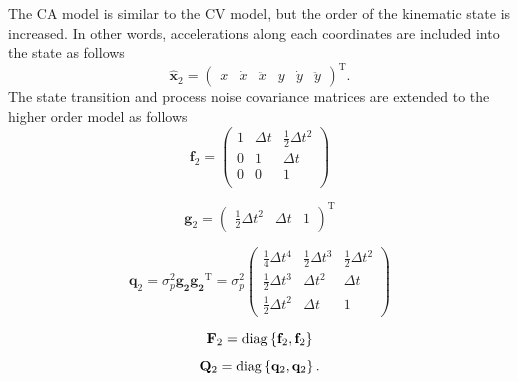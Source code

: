 \documentclass[english, 12pt, a4paper, elec, utf8, a-1b, online]{aaltothesis}
\renewcommand{\vec}[1]{\mathbf{#1}}
\newcommand{\transpose}[1]{#1^\text{T}}
\newcommand{\dt}{\Delta t}
\begin{document}
The CA model is similar to the CV model, but the order of the kinematic state is increased.
In other words, accelerations along each coordinates are included into the state as follows  
\begin{equation}\label{eq:x_mode2}
    \hat{\mathbf{x}}_2 =
        \transpose{
        \begin{pmatrix}
            x & \dot{x} & \ddot{x} & y & \dot{y} & \ddot{y}
        \end{pmatrix}}.
\end{equation}
The state transition and process noise covariance matrices are extended to the higher order model as follows    
\begin{equation}\label{eq:f_mode2}
    \vec{f}_2 = 
    \begin{pmatrix}
        1 & \dt & \frac{1}{2}\dt^2  \\ 
        0 & 1 & \dt \\
        0 & 0 & 1  \\
    \end{pmatrix}
\end{equation}

\begin{equation}
    \vec{g}_2 = \transpose{
        \begin{pmatrix}
            \frac{1}{2} \dt^2 & \dt & 1
        \end{pmatrix}
    }
\end{equation}

\begin{equation}
    \vec{q}_2 = \sigma_p^2 \vec{g_2} \transpose{\vec{g_2}}  =  \sigma_p^2
        \begin{pmatrix}
            \frac{1}{4} \dt^4 & \frac{1}{2} \dt^3 & \frac{1}{2} \dt^2 \\ 
            \frac{1}{2} \dt^3 & \dt^2 &  \dt \\
            \frac{1}{2} \dt^2 & \dt & 1
        \end{pmatrix}
\end{equation}

\begin{equation}\label{eq:F_mode2}
\vec{F}_2 = \diag{\vec{f}_2, \vec{f}_2}
\end{equation}
\begin{equation}
    \vec{Q}_2 = \diag{\vec{q}_2, \vec{q}_2}.
\end{equation}
\end{document}
